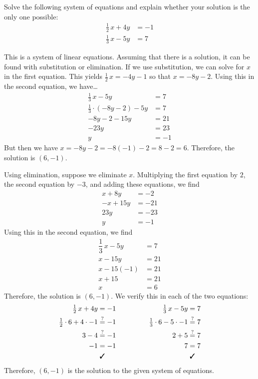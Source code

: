 \documentclass[11pt,letterpaper]{article}
\begin{document}
\newpage



 Solve the following system of equations and explain whether your solution is the only one possible:
	\[
	\begin{aligned}
	\frac{1}{2}\,x + 4y&= -1 \\[0.3cm]
	\frac{1}{3}\,x - 5y&= 7
	\end{aligned}
	\] \pspace

\sol This is a system of linear equations. Assuming that there is a solution, it can be found with substitution or elimination. If we use substitution, we can solve for $x$ in the first equation. This yields $\frac{1}{2}\,x= -4y - 1$ so that $x= -8y - 2$. Using this in the second equation, we have\dots
	\[
	\begin{aligned}
	\frac{1}{3}\,x - 5y&= 7 \\
	\frac{1}{3} \cdot (-8y - 2) - 5y&= 7 \\
	-8y - 2 - 15y&= 21 \\
	-23y&= 23 \\
	y&= -1
	\end{aligned}
	\]
But then we have $x= -8y - 2= -8(-1) - 2= 8 - 2= 6$. Therefore, the solution is $(6, -1)$. \pspace

Using elimination, suppose we eliminate $x$. Multiplying the first equation by $2$, the second equation by $-3$, and adding these equations, we find
	\[
	\begin{aligned}
	x + 8y&= -2 \\
	-x + 15y&= -21 \\ \hline
	23y&= -23 \\
	y&= -1
	\end{aligned}
	\] 
Using this in the second equation, we find
	\[
	\begin{aligned}
	\dfrac{1}{3}\,x - 5y&= 7 \\
	x - 15y&= 21 \\
	x - 15(-1)&= 21 \\
	x + 15&= 21 \\
	x&= 6
	\end{aligned}
	\]
Therefore, the solution is $(6, -1)$. We verify this in each of the two equations: 
	\[
	\begin{aligned}
	\tfrac{1}{2}\,x + 4y&= -1 &\hspace{2cm} \tfrac{1}{3}\,x - 5y&= 7 \\
	\tfrac{1}{2} \cdot 6 + 4 \cdot -1&\stackrel{?}{=} -1 & \tfrac{1}{3} \cdot 6 - 5 \cdot -1&\stackrel{?}{=} 7 \\
	3 - 4&\stackrel{?}{=} -1 & 2 + 5&\stackrel{?}{=} 7 \\
	-1&= -1 & 7&= 7 \\
	&\text{\;\cmark} & &\text{\;\cmark}
	\end{aligned}
	\]
Therefore, $(6, -1)$ is the solution to the given system of equations. 
\end{document}

